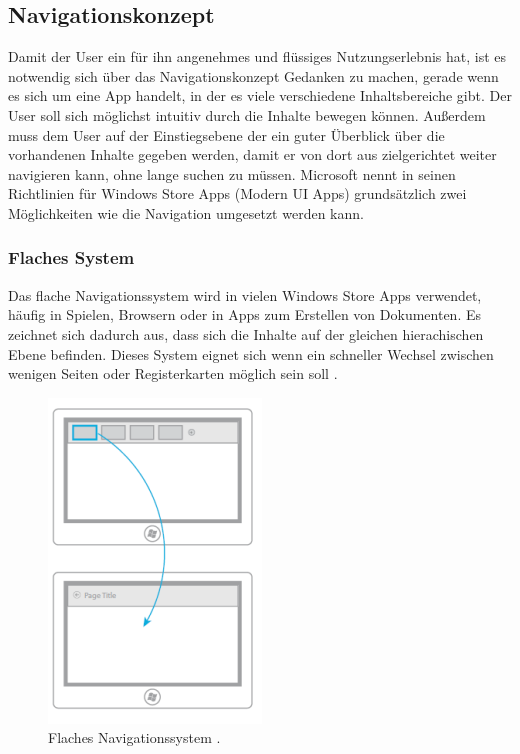 \documentclass[12pt,a4paper,bibtotoc,abstracton]{scrartcl}
\begin{document}
\subsection{Navigationskonzept}
\label{subsec:navikonzept}
Damit der User ein für ihn angenehmes und flüssiges Nutzungserlebnis hat, ist es notwendig sich über das Navigationskonzept Gedanken zu machen, gerade wenn es sich um eine App handelt, in der es viele verschiedene Inhaltsbereiche gibt. Der User soll sich möglichst intuitiv durch die Inhalte bewegen können. Außerdem muss dem User auf der Einstiegsebene der ein guter Überblick über die vorhandenen Inhalte gegeben werden, damit er von dort aus zielgerichtet weiter navigieren kann, ohne lange suchen zu müssen. Microsoft nennt in seinen Richtlinien für Windows Store Apps (Modern UI Apps) grundsätzlich zwei Möglichkeiten wie die Navigation umgesetzt werden kann.

\subsubsection{Flaches System}
\label{subsubsec:flachessystem}
Das flache Navigationssystem wird in vielen Windows Store Apps verwendet, häufig in Spielen, Browsern oder in Apps zum Erstellen von Dokumenten. Es zeichnet sich dadurch aus, dass sich die Inhalte auf der gleichen hierachischen Ebene befinden. Dieses System eignet sich wenn ein schneller Wechsel zwischen wenigen Seiten oder Registerkarten möglich sein soll \citep{MicrosoftNavidesign2013}.

\begin{figure}[h]	
	\centering
	\includegraphics[scale=1]{Bilder/Abbildungen/ms_navigation_flach.png} 
	\caption{Flaches Navigationssystem \protect\citep{MicrosoftNavidesign2013}.}
	\label{fig:naviflach}
\end{figure}
\end{document}
